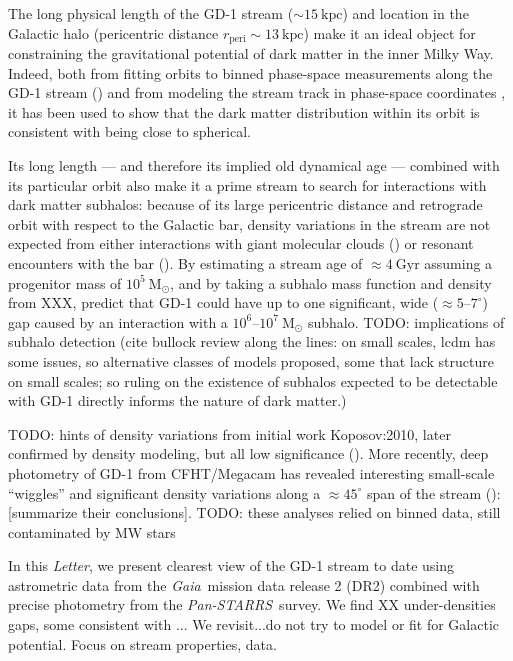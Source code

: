 \documentclass[modern]{aastex62}
\newcommand{\acronym}[1]{{\small{#1}}}
\newcommand{\gaia}{\textsl{Gaia}}
\newcommand{\pans}{\textsl{Pan-STARRS}}
\newcommand{\DR}{\acronym{DR2}}
\newcommand{\msun}{\textrm{M}_\odot}
\newcommand{\kpc}{\textrm{kpc}}
\newcommand{\article}{\textsl{Letter}}
\newcommand{\todo}[1]{{\color{red} TODO: #1}}
\begin{document}
The long physical length of the GD-1 stream ($\sim 15~\kpc$) and location in the
Galactic halo (pericentric distance $r_\textrm{peri} \sim 13~\kpc$) make it an
ideal object for constraining the gravitational potential of dark matter in the
inner Milky Way.
Indeed, both from fitting orbits to binned phase-space measurements along the
GD-1 stream (\citealt{Koposov:2010}) and from modeling the stream track in
phase-space coordinates \citep{Bowden:2015, Bovy:2016}, it has been used to show that the
dark matter distribution within its orbit is consistent with being close to
spherical.

Its long length --- and therefore its implied old dynamical age --- combined
with its particular orbit also make it a prime stream to search for interactions
with dark matter subhalos:
because of its large pericentric distance and retrograde orbit with respect to
the Galactic bar, density variations in the stream are not expected from either
interactions with giant molecular clouds (\citealt{Amorisco:2016}) or resonant
encounters with the bar (\citealt{Pearson:2017}).
By estimating a stream age of $\approx 4~\textrm{Gyr}$ assuming a progenitor
mass of $10^5~\msun$, and by taking a subhalo mass function and density from
XXX, \citet{Erkal:2016} predict that GD-1 could have up to one significant, wide
($\approx 5$--$7^\circ$) gap caused by an interaction with a
$10^6$--$10^7~\msun$ subhalo.
\todo{implications of subhalo detection (cite bullock review along the lines: on small scales, lcdm has some issues, so alternative classes of models proposed, some that lack structure on small scales; so ruling on the existence of subhalos expected to be detectable with GD-1 directly informs the nature of dark matter.)}

\todo{hints of density variations} from initial work Koposov:2010, later confirmed by density modeling, but all low significance
(\citealt{Carlberg:2013}).
More recently, deep photometry of GD-1 from CFHT/Megacam has revealed
interesting small-scale ``wiggles'' and significant density variations along a $\approx 45^\circ$ span of the stream (\citealt{DeBoer:2018}):
[summarize their conclusions].
\todo{these analyses relied on binned data, still contaminated by MW stars}

In this \article, we present clearest view of the GD-1 stream to date using
astrometric data from the \gaia\ mission data release 2 (\DR) combined with
precise photometry from the \pans\ survey.
We find XX under-densities gaps, some consistent with ...
We revisit...do not try to model or fit for Galactic potential.
Focus on stream properties, data.
\end{document}
